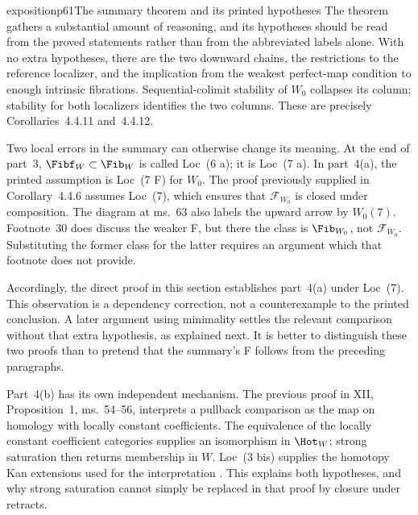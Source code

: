\begin{dcomment}{exposition}{p61}{The summary theorem and its printed hypotheses}
The theorem gathers a substantial amount of reasoning, and its hypotheses should be read from the proved statements rather than from the abbreviated labels alone. With no extra hypotheses, there are the two downward chains, the restrictions to the reference localizer, and the implication from the weakest perfect-map condition to enough intrinsic fibrations. Sequential-colimit stability of $W_0$ collapses its column; stability for both localizers identifies the two columns. These are precisely Corollaries~4.4.11 and~4.4.12.

Two local errors in the summary can otherwise change its meaning. At the end of part~3, $\Fibf_W\subset\Fib_W$ is called Loc~(6 a); it is Loc~(7 a). In part~4(a), the printed assumption is Loc~(7 F) for $W_0$. The proof previously supplied in Corollary~4.4.6 assumes Loc~(7), which ensures that $\mathcal F_{W_0}$ is closed under composition. The diagram at ms.~63 also labels the upward arrow by $W_0(7)$. Footnote~30 does discuss the weaker F, but there the class is $\Fib_{W_0}$, not $\mathcal F_{W_0}$. Substituting the former class for the latter requires an argument which that footnote does not provide.

Accordingly, the direct proof in this section establishes part~4(a) under Loc~(7). This observation is a dependency correction, not a counterexample to the printed conclusion. A later argument using minimality settles the relevant comparison without that extra hypothesis, as explained next. It is better to distinguish these two proofs than to pretend that the summary's F follows from the preceding paragraphs.

Part~4(b) has its own independent mechanism. The previous proof in XII, Proposition~1, ms.~54--56, interprets a pullback comparison as the map on homology with locally constant coefficients. The equivalence of the locally constant coefficient categories supplies an isomorphism in $\Hot_W$; strong saturation then returns membership in $W$. Loc~(3 bis) supplies the homotopy Kan extensions used for the interpretation \citep{Grothendieck1990XIIa}. This explains both hypotheses, and why strong saturation cannot simply be replaced in that proof by closure under retracts.
\end{dcomment}

